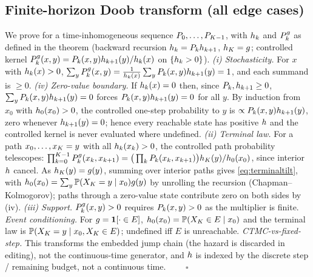 \subsection{Finite-horizon Doob transform (all edge cases)}
\label{app:doob}
We prove  for a time-inhomogeneous sequence $P_0,\dots,P_{K-1}$, with
$h_k$ and $P^{g}_k$ as defined in the theorem (backward recursion
$h_k=P_kh_{k+1}$, $h_K=g$; controlled kernel $P^{g}_k(x,y)=
P_k(x,y)h_{k+1}(y)/h_k(x)$ on $\{h_k>0\}$). \emph{(i) Stochasticity.} For $x$ with
$h_k(x)>0$, $\sum_yP^{g}_k(x,y)=
\frac{1}{h_k(x)}\sum_yP_k(x,y)h_{k+1}(y)=1$, and each summand is $\ge0$.
\emph{(iv) Zero-value boundary.} If $h_k(x)=0$ then, since $P_k,h_{k+1}\ge0$,
$\sum_yP_k(x,y)h_{k+1}(y)=0$ forces $P_k(x,y)h_{k+1}(y)=0$ for all $y$. By induction
from $x_0$ with $h_0(x_0)>0$, the controlled one-step probability to $y$ is
$\propto P_k(x,y)h_{k+1}(y)$, zero whenever $h_{k+1}(y)=0$; hence every reachable state has
positive $h$ and the controlled kernel is never evaluated where undefined. \emph{(ii) Terminal law.} For a
path $x_0,\dots,x_K=y$ with all $h_k(x_k)>0$, the controlled path probability telescopes:
$\prod_{k=0}^{K-1}P^{g}_k(x_k,x_{k+1})=\big(\prod_kP_k(x_k,x_{k+1})\big)
h_K(y)/h_0(x_0)$, since interior $h$ cancel. As $h_K(y)=g(y)$, summing
over interior paths gives \eqref{eq:terminaltilt}, with $h_0(x_0)=\sum_y\mathbb{P}(X_K=y\mid x_0)
g(y)$ by unrolling the recursion (Chapman--Kolmogorov); paths through a zero-value state contribute
zero on both sides by (iv). \emph{(iii) Support.} $P^{g}_k(x,y)>0$ requires $P_k(x,y)>0$
as the multiplier is finite. \emph{Event conditioning.} For $g=\mathbf{1}[\cdot\in E]$, $h_0(x_0)=
\mathbb{P}(X_K\in E\mid x_0)$ and the terminal law is $\mathbb{P}(X_K=y\mid x_0,X_K\in E)$;
undefined iff $E$ is unreachable. \emph{CTMC-vs-fixed-step.} This transforms the embedded jump chain (the
hazard is discarded in editing), not the continuous-time generator, and $h$ is indexed by the discrete
step / remaining budget, not a continuous time. $\qquad\square$

